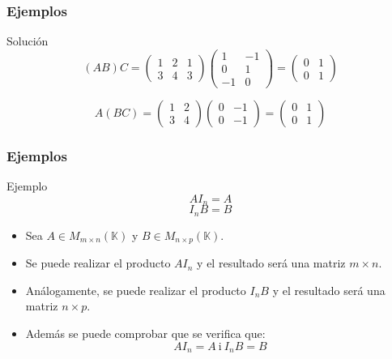\documentclass[aspectratio=169]{beamer}
\begin{document}
 
     \begin{frame}
  \frametitle{Ejemplos}
  
   \begin{block}{Soluci\'on}
  \[ (AB)C = \left(\begin{array}{ccc}1 & 2 &1 \\3 & 4 &3\end{array}\right) 
  	\left(\begin{array}{cc}1 & -1 \\0 & 1 \\-1 & 0\end{array}\right) =
	\left(\begin{array}{cc}0 & 1 \\0 & 1 \end{array}\right)
  \]

  \[ A(BC) =\left(\begin{array}{cc}1 & 2 \\3 & 4\end{array}\right) 
  	\left(\begin{array}{cc}0 & -1 \\0 & -1 \end{array}\right) =
	\left(\begin{array}{cc}0 & 1 \\0 & 1 \end{array}\right)
  \]
  \end{block}


 \end{frame} 
 
 
 
   \begin{frame}
  \frametitle{Ejemplos}
  
   \begin{block}{Ejemplo}
   \[AI_n = A \]
   \[ I_nB = B \]
  \end{block}
   \begin{itemize}

 \item Sea $A\in M_{m\times n}(\mathbb{K})$ y $B\in M_{n\times p}(\mathbb{K})$.
 
 \item Se puede realizar el producto $AI_n$ y el resultado ser\'a una matriz $m\times n$. 
 
\item  An\'alogamente, se puede realizar el producto $I_nB$ y el resultado ser\'a una matriz $n\times p$.
 
 \item Adem\'as se puede comprobar que se verifica que:
   \[AI_n = A\ \mathrm{i}\ I_nB = B \]
\end{itemize}
 \end{frame} 
 
\end{document}

